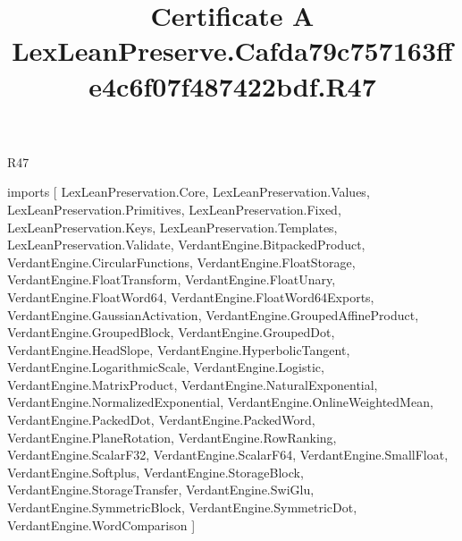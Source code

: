 \begin{lexlean}{R47}
\title{Certificate A LexLeanPreserve.Cafda79c757163ffe4c6f07f487422bdf.R47}
\begin{coremodule}
imports [
  LexLeanPreservation.Core,
  LexLeanPreservation.Values,
  LexLeanPreservation.Primitives,
  LexLeanPreservation.Fixed,
  LexLeanPreservation.Keys,
  LexLeanPreservation.Templates,
  LexLeanPreservation.Validate,
  VerdantEngine.BitpackedProduct,
  VerdantEngine.CircularFunctions,
  VerdantEngine.FloatStorage,
  VerdantEngine.FloatTransform,
  VerdantEngine.FloatUnary,
  VerdantEngine.FloatWord64,
  VerdantEngine.FloatWord64Exports,
  VerdantEngine.GaussianActivation,
  VerdantEngine.GroupedAffineProduct,
  VerdantEngine.GroupedBlock,
  VerdantEngine.GroupedDot,
  VerdantEngine.HeadSlope,
  VerdantEngine.HyperbolicTangent,
  VerdantEngine.LogarithmicScale,
  VerdantEngine.Logistic,
  VerdantEngine.MatrixProduct,
  VerdantEngine.NaturalExponential,
  VerdantEngine.NormalizedExponential,
  VerdantEngine.OnlineWeightedMean,
  VerdantEngine.PackedDot,
  VerdantEngine.PackedWord,
  VerdantEngine.PlaneRotation,
  VerdantEngine.RowRanking,
  VerdantEngine.ScalarF32,
  VerdantEngine.ScalarF64,
  VerdantEngine.SmallFloat,
  VerdantEngine.Softplus,
  VerdantEngine.StorageBlock,
  VerdantEngine.StorageTransfer,
  VerdantEngine.SwiGlu,
  VerdantEngine.SymmetricBlock,
  VerdantEngine.SymmetricDot,
  VerdantEngine.WordComparison
]


\end{coremodule}
\end{lexlean}
